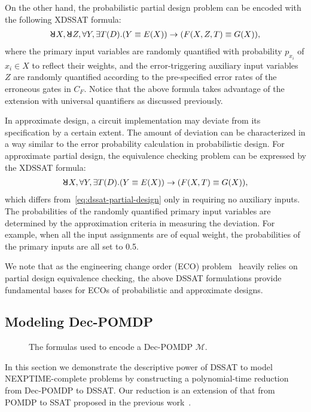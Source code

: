 On the other hand,
the probabilistic partial design problem can be encoded with the following XDSSAT formula:
\begin{align}
    \label{eq:dssat-partial-design}
    \random{} X,\random{} Z,\forall Y,\exists T(D).(Y \equiv E(X)) \limply (F(X,Z,T)\equiv G(X)),
\end{align}
where the primary input variables are randomly quantified with probability $p_{x_i}$ of $x_i \in X$ to reflect their weights,
and the error-triggering auxiliary input variables $Z$ are randomly quantified according to the pre-specified error rates of the erroneous gates in $C_F$.
Notice that the above formula takes advantage of the extension with universal quantifiers as discussed previously.

In approximate design,
a circuit implementation may deviate from its specification by a certain extent.
The amount of deviation can be characterized in a way similar to the error probability calculation in probabilistic design.
For approximate partial design,
the equivalence checking problem can be expressed by the XDSSAT formula:
\begin{align}
    \label{eq:dssat-approximate-design}
    \random{} X,\forall Y,\exists T(D).(Y \equiv E(X)) \limply (F(X,T)\equiv G(X)),
\end{align}
which differs from~\cref{eq:dssat-partial-design} only in requiring no auxiliary inputs.
The probabilities of the randomly quantified primary input variables are determined by the approximation criteria in measuring the deviation.
For example, when all the input assignments are of equal weight,
the probabilities of the primary inputs are all set to 0.5.

We note that as the engineering change order (ECO) problem~\cite{JiangDATE20ECOSurvey} heavily relies on partial design equivalence checking,
the above DSSAT formulations provide fundamental bases for ECOs of probabilistic and approximate designs.

\subsection{Modeling Dec-POMDP}
\begin{figure*}[t]
    \centering
    
    \caption{The formulas used to encode a Dec-POMDP $\mathcal{M}$.}\label{fig:formula}
    \vspace{-0.5cm}
\end{figure*}

In this section we demonstrate the descriptive power of DSSAT to model NEXPTIME-complete problems by constructing a polynomial-time reduction from Dec-POMDP to DSSAT.
Our reduction is an extension of that from POMDP to SSAT proposed in the previous work~\cite{Salmon2020}.

